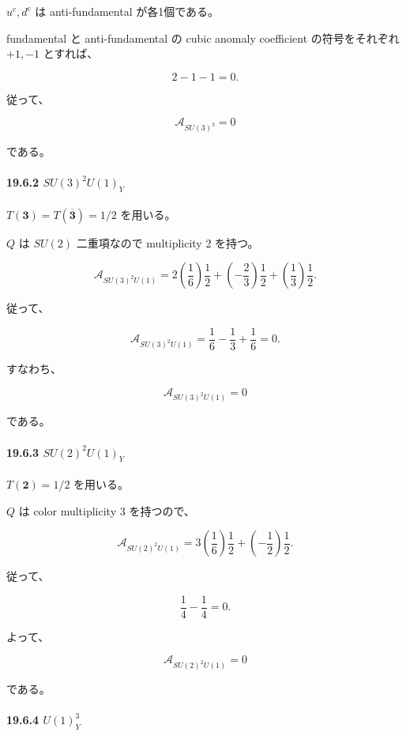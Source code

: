 \documentclass[
  a4paper,
]{ltjsarticle}
\begin{document}
\(u^c,d^c\) は anti-fundamental が各1個である。

fundamental と anti-fundamental の cubic anomaly coefficient
の符号をそれぞれ \(+1,-1\) とすれば、

\[
2-1-1=0.
\]

従って、

\[
\boxed{
\mathcal A_{SU(3)^3}=0
}
\tag{125}
\]

である。

\paragraph{\texorpdfstring{19.6.2
\(SU(3)^2U(1)_Y\)}{19.6.2 SU(3)\^{}2U(1)\_Y}}\label{su32u1_y}

\(T(\mathbf3)=T(\overline{\mathbf3})=1/2\) を用いる。

\(Q\) は \(SU(2)\) 二重項なので multiplicity 2 を持つ。

\[
\mathcal A_{SU(3)^2U(1)}
=
2\left(\frac16\right)\frac12
+
\left(-\frac23\right)\frac12
+
\left(\frac13\right)\frac12.
\]

従って、

\[
\mathcal A_{SU(3)^2U(1)}
=
\frac16-\frac13+\frac16
=
0.
\]

すなわち、

\[
\boxed{
\mathcal A_{SU(3)^2U(1)}=0
}
\tag{126}
\]

である。

\paragraph{\texorpdfstring{19.6.3
\(SU(2)^2U(1)_Y\)}{19.6.3 SU(2)\^{}2U(1)\_Y}}\label{su22u1_y}

\(T(\mathbf2)=1/2\) を用いる。

\(Q\) は color multiplicity 3 を持つので、

\[
\mathcal A_{SU(2)^2U(1)}
=
3\left(\frac16\right)\frac12
+
\left(-\frac12\right)\frac12.
\]

従って、

\[
\frac14-\frac14=0.
\]

よって、

\[
\boxed{
\mathcal A_{SU(2)^2U(1)}=0
}
\tag{127}
\]

である。

\paragraph{\texorpdfstring{19.6.4
\(U(1)_Y^3\)}{19.6.4 U(1)\_Y\^{}3}}\label{u1_y3}
\end{document}
